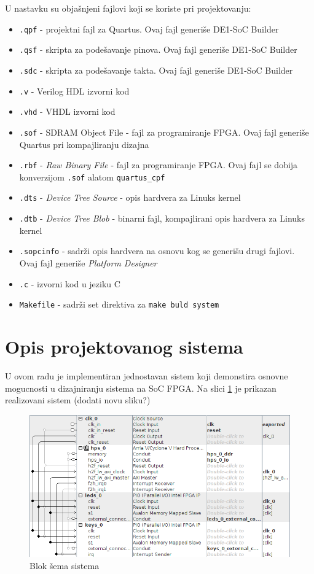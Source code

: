 U nastavku su objašnjeni fajlovi koji se koriste pri projektovanju:
\begin{itemize}
\item \texttt{.qpf} - projektni fajl za Quartus. Ovaj fajl generiše DE1-SoC Builder
\item \texttt{.qsf} - skripta za podešavanje pinova. Ovaj fajl generiše DE1-SoC Builder
\item \texttt{.sdc} - skripta za podešavanje takta. Ovaj fajl generiše DE1-SoC Builder
\item \texttt{.v} - Verilog HDL izvorni kod
\item \texttt{.vhd} - VHDL izvorni kod
\item \texttt{.sof} -  SDRAM Object File - fajl za programiranje FPGA.  Ovaj fajl generiše Quartus pri kompajliranju dizajna
\item \texttt{.rbf} - \textit{Raw Binary File} - fajl za programiranje FPGA. Ovaj fajl se dobija konverzijom \texttt{.sof} alatom \texttt{quartus\_cpf}
\item \texttt{.dts} - \textit{Device Tree Source} - opis hardvera za Linuks kernel
\item \texttt{.dtb} - \textit{Device Tree Blob} - binarni fajl, kompajlirani opis hardvera za Linuks kernel
\item \texttt{.sopcinfo} - sadrži opis hardvera na osnovu kog se generišu drugi fajlovi. Ovaj fajl generiše \textit{Platform Designer}
\item \texttt{.c} - izvorni kod u jeziku C
\item \texttt{Makefile} - sadrži set direktiva za \texttt{make buld system}
\end{itemize} 
\pagebreak
\section{Opis projektovanog sistema}

U ovom radu je implementiran jednostavan sistem koji demonstira osnovne mogucnosti u dizajniranju sistema na SoC FPGA. Na slici \ref{slika:q3} je prikazan realizovani sistem (dodati novu sliku?)

\begin{figure}[h!]
\centering
\includegraphics[scale=0.9]{img/quartus3.png}
\caption{Blok šema sistema}
\label{slika:q3}
\end{figure}

